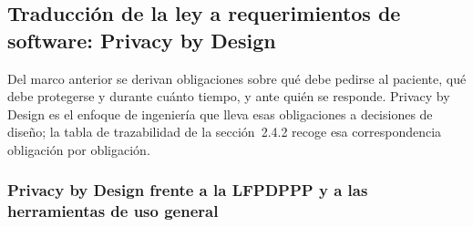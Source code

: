 \documentclass[12pt, a4paper]{article}
\begin{document}
\subsection{Traducción de la ley a requerimientos de software:
Privacy by Design}
Del marco anterior se derivan obligaciones sobre qué debe pedirse
al paciente, qué debe protegerse y durante cuánto tiempo, y ante
quién se responde. Privacy by Design es el enfoque de ingeniería
que lleva esas obligaciones a decisiones de diseño; la tabla de
trazabilidad de la sección~2.4.2 recoge esa correspondencia obligación por
obligación.

\subsubsection{Privacy by Design frente a la LFPDPPP y a las herramientas de uso general}
\end{document}
